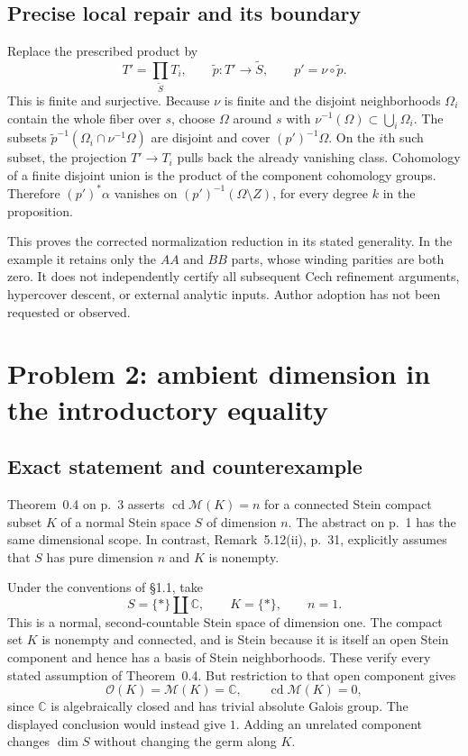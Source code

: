 \documentclass[10pt]{article}
\begin{document}
\subsection*{Precise local repair and its boundary}
Replace the prescribed product by \[T'=\prod_{\widetilde S}T_i,\qquad
 \widetilde p:T'\to\widetilde S,\qquad p'=\nu\circ\widetilde p.\] This is finite and surjective. Because \(\nu\) is finite and the disjoint neighborhoods \(\Omega_i\) contain the whole fiber over \(s\), choose \(\Omega\) around \(s\) with \(\nu^{-1}(\Omega)\subset\bigcup_i\Omega_i\). The subsets \(\widetilde p^{-1}(\Omega_i\cap\nu^{-1}\Omega)\) are disjoint and cover \((p')^{-1}\Omega\). On the \(i\)th such subset, the projection \(T'\to T_i\) pulls back the already vanishing class. Cohomology of a finite disjoint union is the product of the component cohomology groups. Therefore \((p')^*\alpha\) vanishes on \((p')^{-1}(\Omega\setminus Z)\), for every degree \(k\) in the proposition.\par
This proves the corrected normalization reduction in its stated generality. In the example it retains only the \(AA\) and \(BB\) parts, whose winding parities are both zero. It does not independently certify all subsequent Cech refinement arguments, hypercover descent, or external analytic inputs. Author adoption has not been requested or observed.\par
\section*{Problem 2: ambient dimension in the introductory equality}
\subsection*{Exact statement and counterexample}
Theorem 0.4 on p. 3 asserts \(\operatorname{cd}\mathcal M(K)=n\) for a connected Stein compact subset \(K\) of a normal Stein space \(S\) of dimension \(n\). The abstract on p. 1 has the same dimensional scope. In contrast, Remark 5.12(ii), p. 31, explicitly assumes that \(S\) has pure dimension \(n\) and \(K\) is nonempty.\par
Under the conventions of §1.1, take \[S=\{\ast\}\amalg\mathbb C,\qquad K=\{\ast\},\qquad n=1.\] This is a normal, second-countable Stein space of dimension one. The compact set \(K\) is nonempty and connected, and is Stein because it is itself an open Stein component and hence has a basis of Stein neighborhoods. These verify every stated assumption of Theorem 0.4. But restriction to that open component gives \[\mathcal O(K)=\mathcal M(K)=\mathbb C,\qquad \operatorname{cd}\mathcal M(K)=0,\] since \(\mathbb C\) is algebraically closed and has trivial absolute Galois group. The displayed conclusion would instead give \(1\). Adding an unrelated component changes \(\dim S\) without changing the germ along \(K\).\par
\end{document}
